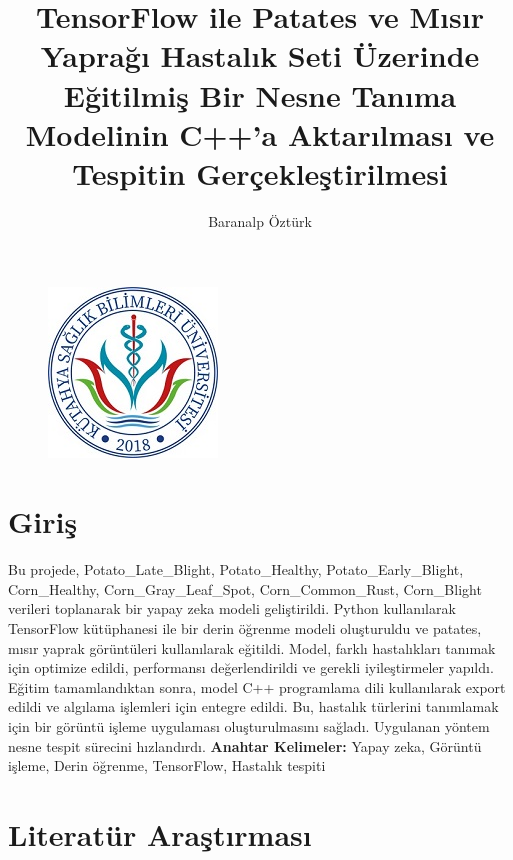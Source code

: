 \documentclass[12pt,a4paper]{article}
\date{}
\title{TensorFlow ile Patates ve Mısır Yaprağı Hastalık Seti Üzerinde Eğitilmiş Bir Nesne Tanıma Modelinin C++'a Aktarılması ve Tespitin Gerçekleştirilmesi}
\author{Baranalp Öztürk}
\begin{document}
	\begin{figure}
		\centering
		\includegraphics{ksbu.jpg}
	\end{figure}
	
	\maketitle
	
	\section{Giriş}
	\small
	\hspace{2em} Bu projede, Potato\_Late\_Blight, Potato\_Healthy, Potato\_Early\_Blight, Corn\_Healthy, Corn\_Gray\_Leaf\_Spot, Corn\_Common\_Rust, Corn\_Blight verileri toplanarak bir yapay zeka modeli geliştirildi. Python kullanılarak TensorFlow kütüphanesi ile bir derin öğrenme modeli oluşturuldu ve patates, mısır yaprak görüntüleri kullanılarak eğitildi. Model, farklı hastalıkları tanımak için optimize edildi, performansı değerlendirildi ve gerekli iyileştirmeler yapıldı. Eğitim tamamlandıktan sonra, model C++ programlama dili kullanılarak export edildi ve algılama işlemleri için entegre edildi. Bu, hastalık türlerini tanımlamak için bir görüntü işleme uygulaması oluşturulmasını sağladı. Uygulanan yöntem nesne tespit sürecini hızlandırdı.
	\newline \textbf{Anahtar Kelimeler:} Yapay zeka, Görüntü işleme, Derin öğrenme, TensorFlow, Hastalık tespiti
	
	
	\clearpage
				
		
		
		
			\section{Literatür Araştırması}			
				
\end{document}
